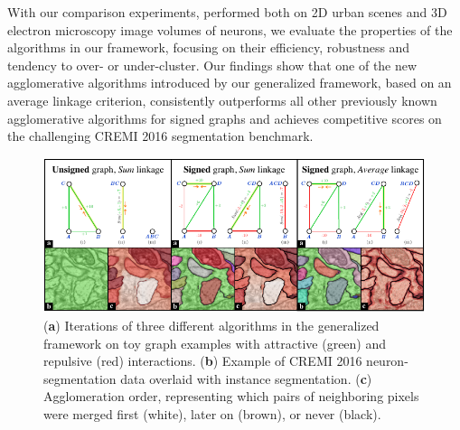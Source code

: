 With our comparison experiments, performed both on 2D urban scenes and 3D electron microscopy image volumes of neurons, we evaluate the properties of the algorithms in our framework, focusing on their efficiency, robustness and tendency to over- or under-cluster.
Our findings show that one of the new agglomerative algorithms introduced by our generalized framework, based on an average linkage criterion, consistently outperforms all other previously known agglomerative algorithms for signed graphs and achieves competitive scores on the challenging CREMI 2016 segmentation benchmark.



\begin{figure}[t]
\centering
\includegraphics[width=\textwidth]{./figs/intro_image.pdf} %
\caption{
 (\textbf{a}) Iterations of three different algorithms in the generalized framework on  toy graph examples with attractive (green) and repulsive (red) interactions. (\textbf{b}) Example of CREMI 2016 neuron-segmentation data \cite{cremiChallenge} overlaid with instance segmentation. (\textbf{c}) Agglomeration order, representing which pairs of neighboring pixels were merged first (white), later on (brown), or never (black).
\label{fig:intro_figure}}
\end{figure}
